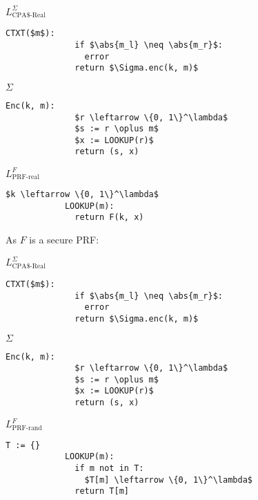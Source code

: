\documentclass[a4paper]{scrreprt}
\DeclarePairedDelimiter\abs{\lvert}{\rvert}
\begin{document}
\begin{tcbraster}[raster columns=3,raster equal height,nobeforeafter,raster column skip=0.2cm]
	\begin{library}{$L^{\Sigma}_{\text{CPA\$-Real}}$}
		\begin{lstlisting}[mathescape=true,autogobble=true]
			CTXT($m$):
			  if $\abs{m_l} \neq \abs{m_r}$:
			    error
			  return $\Sigma.enc(k, m)$
		\end{lstlisting}
	\end{library}
	\begin{library}{$\Sigma$}
		\begin{lstlisting}[mathescape=true,autogobble=true]
			Enc(k, m):
			  $r \leftarrow \{0, 1\}^\lambda$
			  $s := r \oplus m$
			  $x := LOOKUP(r)$
			  return (s, x)
		\end{lstlisting}
	\end{library}
	\begin{library}{$L^{F}_{\text{PRF-real}}$}
		\begin{lstlisting}[mathescape=true,autogobble=true]
			$k \leftarrow \{0, 1\}^\lambda$
			LOOKUP(m):
			  return F(k, x)
		\end{lstlisting}
	\end{library}
\end{tcbraster}

As $F$ is a secure PRF:

\begin{tcbraster}[raster columns=3,raster equal height,nobeforeafter,raster column skip=0.2cm]
	\begin{library}{$L^{\Sigma}_{\text{CPA\$-Real}}$}
		\begin{lstlisting}[mathescape=true,autogobble=true]
			CTXT($m$):
			  if $\abs{m_l} \neq \abs{m_r}$:
			    error
			  return $\Sigma.enc(k, m)$
		\end{lstlisting}
	\end{library}
	\begin{library}{$\Sigma$}
		\begin{lstlisting}[mathescape=true,autogobble=true]
			Enc(k, m):
			  $r \leftarrow \{0, 1\}^\lambda$
			  $s := r \oplus m$
			  $x := LOOKUP(r)$
			  return (s, x)
		\end{lstlisting}
	\end{library}
	\begin{library}{$L^{F}_{\text{PRF-rand}}$}
		\begin{lstlisting}[mathescape=true,autogobble=true]
			T := {}
			LOOKUP(m):
			  if m not in T:
			    $T[m] \leftarrow \{0, 1\}^\lambda$
			  return T[m]
		\end{lstlisting}
	\end{library}
\end{tcbraster}
\end{document}
